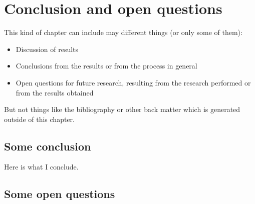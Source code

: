 \chapter{Conclusion and open questions}
\label{chap:conclusion}

This kind of chapter can include may different things (or only some of them):
\begin{itemize}
\item Discussion of results
\item Conclusions from the results or from the process in general
\item Open questions for future research, resulting from the research performed or from the results obtained
\end{itemize}

But not things like the bibliography or other back matter which is generated outside of this chapter.

\section{Some conclusion}

Here is what I conclude.

\section{Some open questions}
